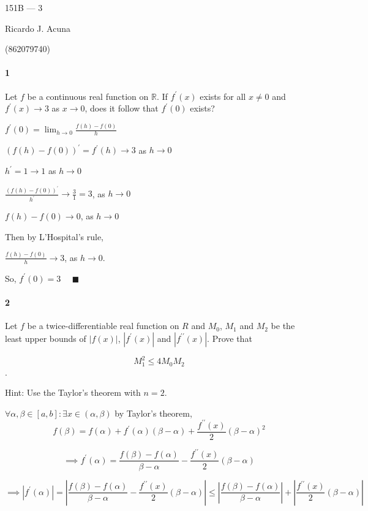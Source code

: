 \documentclass{article}
\newcommand\R{\mathbb{R}}
\begin{document}
\begin{center}
  151B --- 3

  Ricardo J. Acuna

  (862079740)
\end{center}\vspace{1.618em}

\paragraph{1} Let $f$ be a continuous real function on $\R$. If
$f^\prime(x)$ exists for all $x\neq 0$ and $f^\prime (x) \rightarrow
3$ as $x\rightarrow 0$, does it follow that $f^\prime(0)$ exists?


$f^\prime(0) = \lim_{h\rightarrow 0} \frac{f(h)-f(0)}{h}$

$(f(h)-f(0))^\prime = f^\prime(h)\rightarrow 3$ as $h\rightarrow 0$

$h^\prime = 1 \rightarrow 1$ as $h\rightarrow 0$

$\frac{(f(h)-f(0))^\prime}{h^\prime} \rightarrow \frac{3}{1} = 3$, as
$h\rightarrow 0$

$f(h)-f(0) \rightarrow 0$, as $h\rightarrow 0$

Then by L'Hospital's rule,

$\frac{f(h)-f(0)}{h} \rightarrow 3$, as $h\rightarrow 0$.

So, $f^\prime(0) = 3$
$\quad \blacksquare$

\paragraph{2}  Let $f$ be a twice-differentiable real function on $R$ and $M_0$, $M_1$ and $M_2$ be the least upper
bounds of $|f(x)|$, $|f^\prime(x)|$ and $|f^{\prime\prime}(x)|$. Prove that

\[M_1^2 \leq 4 M_0M_2\].

Hint: Use the Taylor’s theorem with $n = 2$.

$\forall \alpha,\beta \in [a,b]: \exists x\in (\alpha,\beta)$ by
Taylor's theorem,
\[f(\beta) = f(\alpha) +f^\prime(\alpha)(\beta -\alpha)
  +\frac{f^{\prime\prime}(x)}{2}(\beta-\alpha)^2\]

\[\implies f^\prime(\alpha) = \frac{f(\beta) - f(\alpha)}{\beta -\alpha} -
  \frac{f^{\prime\prime}(x)}{2}(\beta-\alpha)\]

\[\implies |f^\prime(\alpha)| = \left|\frac{f(\beta) - f(\alpha)}{\beta -\alpha} -
  \frac{f^{\prime\prime}(x)}{2}(\beta-\alpha)\right| \leq \left|\frac{f(\beta) -
    f(\alpha)}{\beta -\alpha}\right| + \left|\frac{f^{\prime\prime}(x)}{2}(\beta-\alpha)\right| \]
\end{document}
